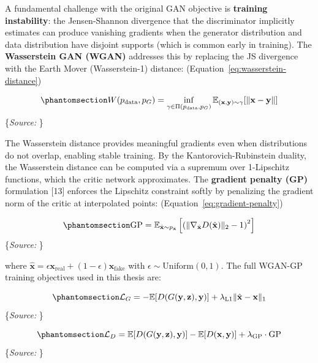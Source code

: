 \documentclass[
  english,
  12pt,
  12pt,
  a4paper,
  oneside]{report}
\begin{document}
A fundamental challenge with the original GAN objective is \textbf{training instability}: the Jensen-Shannon divergence that the discriminator implicitly estimates can produce vanishing gradients when the generator distribution and data distribution have disjoint supports (which is common early in training). The \textbf{Wasserstein GAN (WGAN)} addresses this by replacing the JS divergence with the Earth Mover (Wasserstein-1) distance: (Equation~\ref{eq:wasserstein-distance})

\begin{equation}\protect\phantomsection\label{eq:wasserstein-distance}{W(p_{\text{data}}, p_G) = \inf_{\gamma \in \Pi(p_{\text{data}}, p_G)} \mathbb{E}_{(\mathbf{x}, \mathbf{y}) \sim \gamma}[\|\mathbf{x} - \mathbf{y}\|]
}\end{equation} \footnotesize\{\textit{Source: \1}\}\normalsize

The Wasserstein distance provides meaningful gradients even when distributions do not overlap, enabling stable training. By the Kantorovich-Rubinstein duality, the Wasserstein distance can be computed via a supremum over 1-Lipschitz functions, which the critic network approximates. The \textbf{gradient penalty (GP)} formulation {[}13{]} enforces the Lipschitz constraint softly by penalizing the gradient norm of the critic at interpolated points: (Equation~\ref{eq:gradient-penalty})

\begin{equation}\protect\phantomsection\label{eq:gradient-penalty}{\text{GP} = \mathbb{E}_{\hat{\mathbf{x}} \sim p_{\hat{\mathbf{x}}}}\left[\left(\|\nabla_{\hat{\mathbf{x}}} D(\hat{\mathbf{x}})\|_2 - 1\right)^2\right]
}\end{equation} \footnotesize\{\textit{Source: \1}\}\normalsize

where \(\hat{\mathbf{x}} = \epsilon \mathbf{x}_{\text{real}} + (1-\epsilon) \mathbf{x}_{\text{fake}}\) with \(\epsilon \sim \text{Uniform}(0, 1)\). The full WGAN-GP training objectives used in this thesis are:

\begin{equation}\protect\phantomsection\label{eq:wgan-gen-loss}{\mathcal{L}_G = -\mathbb{E}[D(G(\mathbf{y}, \mathbf{z}), \mathbf{y})] + \lambda_{\text{L1}} \|\hat{\mathbf{x}} - \mathbf{x}\|_1
}\end{equation} \footnotesize\{\textit{Source: \1}\}\normalsize

\begin{equation}\protect\phantomsection\label{eq:wgan-disc-loss}{\mathcal{L}_D = \mathbb{E}[D(G(\mathbf{y}, \mathbf{z}), \mathbf{y})] - \mathbb{E}[D(\mathbf{x}, \mathbf{y})] + \lambda_{\text{GP}} \cdot \text{GP}
}\end{equation} \footnotesize\{\textit{Source: \1}\}\normalsize
\end{document}

